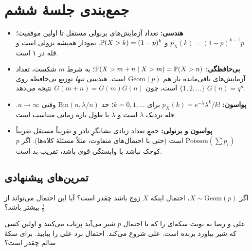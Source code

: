 \section*{جمع‌بندی جلسهٔ ششم}

\begin{summary}
\begin{itemize}
  \item \textbf{هندسی:} تعداد آزمایش‌های برنولی مستقل تا اولین موفقیت؛ $p_X(k)=(1-p)^{k-1}p$ و $\P(X>k)=(1-p)^k$. نمودار همیشه نزولی است و قله در ۱ است.
  \item \textbf{بی‌حافظگی:} $\P(X>m+n\mid X>m)=\P(X>n)$؛ به شرط $m$ شکست، تعداد آزمایش‌های باقی‌مانده باز هم $\mathrm{Geom}(p)$ است. هندسی \emph{تنها} توزیع بی‌حافظه روی $\{1,2,\dots\}$ است، چون $G(m+n)=G(m)G(n)$ نتیجه می‌دهد $G(n)=q^n$.
  \item \textbf{پواسون:} $p_X(k)=e^{-\lambda}\lambda^k/k!$ برای $k=0,1,\dots$؛ حد $\mathrm{Bin}(n,\lambda/n)$ وقتی $n\to\infty$. قله نزدیک $\lambda$ است و $\lambda$ با طول بازهٔ زمانی متناسب است.
  \item \textbf{پواسون و برنولی:} جمعِ تعداد زیادی نشانگرِ نادر و تقریباً مستقل تقریباً $\mathrm{Poisson}(\sum p_i)$ است (حتی با احتمال‌های متفاوت، مثلاً مسئلهٔ کلاه‌ها). اگر $p$ کوچک نباشد یا وابستگی قوی باشد، تقریب بد است.
\end{itemize}
\end{summary}

\subsection*{تمرین‌های پیشنهادی}

\begin{exercise}
اگر $X\sim\mathrm{Geom}(p)$، احتمال اینکه $X$ زوج باشد چقدر است؟ آیا این احتمال می‌تواند از $\tfrac12$ بیشتر باشد؟
\end{exercise}

\begin{exercise}
علی و رضا به نوبت سکه‌ای را که با احتمال $p$ شیر می‌آید پرتاب می‌کنند و اولین کسی که شیر بیاورد برنده است. علی شروع می‌کند. احتمال برد علی را بیابید. برای سکهٔ سالم چقدر است؟
\end{exercise}

